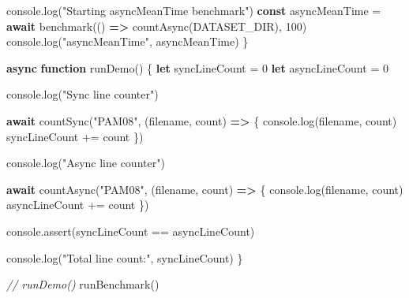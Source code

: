 \documentclass[11pt]{article}
\newenvironment{Shaded}{}{}
\newcommand{\KeywordTok}[1]{\textcolor[rgb]{0.00,0.44,0.13}{\textbf{{#1}}}}
\newcommand{\DecValTok}[1]{\textcolor[rgb]{0.25,0.63,0.44}{{#1}}}
\newcommand{\StringTok}[1]{\textcolor[rgb]{0.25,0.44,0.63}{{#1}}}
\newcommand{\CommentTok}[1]{\textcolor[rgb]{0.38,0.63,0.69}{\textit{{#1}}}}
\newcommand{\FunctionTok}[1]{\textcolor[rgb]{0.02,0.16,0.49}{{#1}}}
\newcommand{\NormalTok}[1]{{#1}}
\newcommand{\ControlFlowTok}[1]{\textcolor[rgb]{0.00,0.44,0.13}{\textbf{{#1}}}}
\newcommand{\OperatorTok}[1]{\textcolor[rgb]{0.40,0.40,0.40}{{#1}}}
\newcommand{\BuiltInTok}[1]{{#1}}
\begin{document}
\begin{Shaded}
\begin{Highlighting}[]
    \BuiltInTok{console}\OperatorTok{.}\FunctionTok{log}\NormalTok{(}\StringTok{"Starting asyncMeanTime benchmark"}\NormalTok{)}
    \KeywordTok{const}\NormalTok{ asyncMeanTime }\OperatorTok{=} \ControlFlowTok{await} \FunctionTok{benchmark}\NormalTok{(() }\KeywordTok{=\textgreater{}} \FunctionTok{countAsync}\NormalTok{(DATASET\_DIR)}\OperatorTok{,} \DecValTok{100}\NormalTok{)}
    \BuiltInTok{console}\OperatorTok{.}\FunctionTok{log}\NormalTok{(}\StringTok{"asyncMeanTime"}\OperatorTok{,}\NormalTok{ asyncMeanTime)}
\NormalTok{\}}

\KeywordTok{async} \KeywordTok{function} \FunctionTok{runDemo}\NormalTok{() \{}
    \KeywordTok{let}\NormalTok{ syncLineCount }\OperatorTok{=} \DecValTok{0}
    \KeywordTok{let}\NormalTok{ asyncLineCount }\OperatorTok{=} \DecValTok{0}

    \BuiltInTok{console}\OperatorTok{.}\FunctionTok{log}\NormalTok{(}\StringTok{"Sync line counter"}\NormalTok{)}

    \ControlFlowTok{await} \FunctionTok{countSync}\NormalTok{(}\StringTok{"PAM08"}\OperatorTok{,}\NormalTok{ (filename}\OperatorTok{,}\NormalTok{ count) }\KeywordTok{=\textgreater{}}\NormalTok{ \{}
        \BuiltInTok{console}\OperatorTok{.}\FunctionTok{log}\NormalTok{(filename}\OperatorTok{,}\NormalTok{ count)}
\NormalTok{        syncLineCount }\OperatorTok{+=}\NormalTok{ count}
\NormalTok{    \})}

    \BuiltInTok{console}\OperatorTok{.}\FunctionTok{log}\NormalTok{(}\StringTok{"Async line counter"}\NormalTok{)}

    \ControlFlowTok{await} \FunctionTok{countAsync}\NormalTok{(}\StringTok{"PAM08"}\OperatorTok{,}\NormalTok{ (filename}\OperatorTok{,}\NormalTok{ count) }\KeywordTok{=\textgreater{}}\NormalTok{ \{}
        \BuiltInTok{console}\OperatorTok{.}\FunctionTok{log}\NormalTok{(filename}\OperatorTok{,}\NormalTok{ count)}
\NormalTok{        asyncLineCount }\OperatorTok{+=}\NormalTok{ count}
\NormalTok{    \})}

    \BuiltInTok{console}\OperatorTok{.}\FunctionTok{assert}\NormalTok{(syncLineCount }\OperatorTok{==}\NormalTok{ asyncLineCount)}

    \BuiltInTok{console}\OperatorTok{.}\FunctionTok{log}\NormalTok{(}\StringTok{"Total line count:"}\OperatorTok{,}\NormalTok{ syncLineCount)}
\NormalTok{\}}

\CommentTok{// runDemo()}
\FunctionTok{runBenchmark}\NormalTok{()}
\end{Highlighting}
\end{Shaded}
\end{document}
